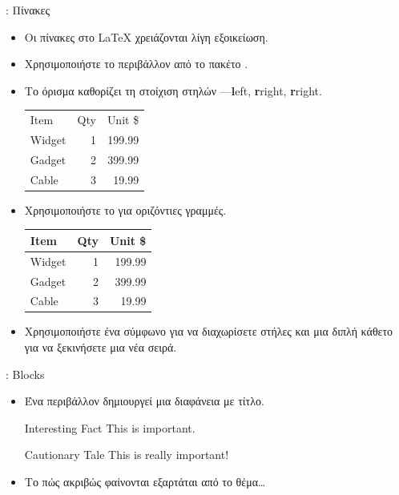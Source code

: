 \documentclass{beamer}
\begin{document}
\begin{frame}[fragile]{\insertsection: Πίνακες}
\begin{itemize}
\item Οι πίνακες στο \LaTeX{} χρειάζονται λίγη εξοικείωση.
\item Χρησιμοποιήστε το περιβάλλον \en {}\gr \space από το πακέτο \en{}\gr.
\item Το όρισμα καθορίζει τη στοίχιση στηλών ---\en \textbf{l}eft, \textbf{r}right, \textbf{r}right.\gr
\en
\begin{exampletwouptiny}
\begin{tabular}{lrr}
Item   & Qty & Unit \$ \\
Widget & 1   & 199.99  \\
Gadget & 2   & 399.99  \\
Cable  & 3   & 19.99   \\
\end{tabular}
\end{exampletwouptiny}
\gr
\item Χρησιμοποιήστε το \en{}\gr \space για οριζόντιες γραμμές.
\en
\begin{exampletwouptiny}
\begin{tabular}{|l|r|r|} \hline
Item   & Qty & Unit \$ \\\hline
Widget & 1   & 199.99  \\
Gadget & 2   & 399.99  \\
Cable  & 3   & 19.99   \\\hline
\end{tabular}
\end{exampletwouptiny}
\gr
\item Χρησιμοποιήστε ένα σύμφωνο \en \keystrokebftt{\&}\gr για να διαχωρίσετε στήλες και μια διπλή κάθετο \en \keystrokebftt{\bs}\keystrokebftt{\bs}\gr για να ξεκινήσετε μια νέα σειρά.
\end{itemize}
\end{frame}

\begin{frame}[fragile]{\insertsection: \en Blocks \gr}
\begin{itemize}
\item Ένα περιβάλλον \en {}\gr δημιουργεί μια διαφάνεια με τίτλο.
\en
\begin{exampletwouptiny}
\begin{block}{Interesting Fact}
This is important.
\end{block}

\begin{alertblock}{Cautionary Tale}
This is really important!
\end{alertblock}
\end{exampletwouptiny}
\gr
\item Το πώς ακριβώς φαίνονται εξαρτάται από το θέμα\ldots
\end{itemize}
\end{frame}
\end{document}
